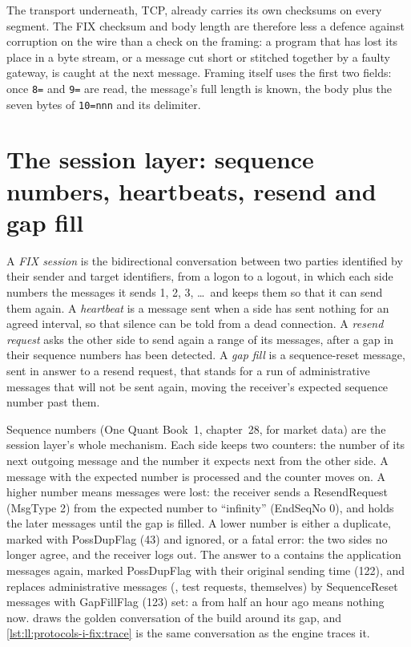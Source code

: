 The transport underneath, TCP, already carries its own checksums on every segment. The FIX checksum and body length are
therefore less a defence against corruption on the wire than a check on the framing: a program that has lost its place in a
byte stream, or a message cut short or stitched together by a faulty gateway, is caught at the next message. Framing itself
uses the first two fields: once \texttt{8=} and \texttt{9=} are read, the message's full length is known, the body plus the
seven bytes of \texttt{10=nnn} and its delimiter.

\section{The session layer: sequence numbers, heartbeats, resend and gap fill}

\begin{definition}\label{def:ll:protocols-i-fix:session}
A \emph{FIX session} is the bidirectional conversation between two parties identified by their sender and
target identifiers, from a logon to a logout, in which each side numbers the messages it sends 1, 2, 3, \dots\ and keeps
them so that it can send them again. A \emph{heartbeat} is a message sent when a side has sent nothing for
an agreed interval, so that silence can be told from a dead connection. A \emph{resend request} asks the
other side to send again a range of its messages, after a gap in their sequence numbers has been detected. A \emph{gap
fill} is a sequence-reset message, sent in answer to a resend request, that stands for a run of
administrative messages that will not be sent again, moving the receiver's expected sequence number past them.
\end{definition}

Sequence numbers (One Quant Book~1, chapter~28, for market data) are the session layer's whole mechanism. Each side keeps two
counters: the number of its next outgoing message and the number it expects next from the other side. A message with the
expected number is processed and the counter moves on. A higher number means messages were lost: the receiver sends a
ResendRequest (MsgType 2) from the expected number to ``infinity'' (EndSeqNo 0), and holds the later messages until the gap is
filled. A lower number is either a duplicate, marked with PossDupFlag (43) and ignored, or a fatal error: the two sides no
longer agree, and the receiver logs out. The answer to a  contains the application messages again, marked
PossDupFlag with their original sending time (122), and replaces administrative messages (, test requests,  themselves) by SequenceReset messages with GapFillFlag (123) set: a  from half an hour ago means nothing
now.  draws the golden conversation of the build around its gap, and
\cref{lst:ll:protocols-i-fix:trace} is the same conversation as the engine traces it.

